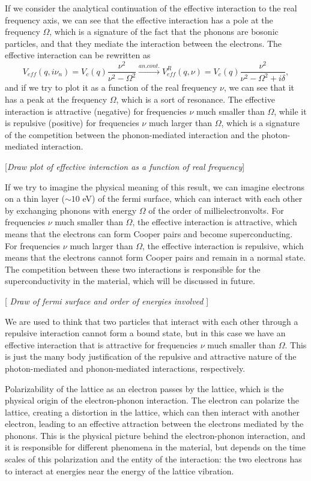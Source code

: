 If we consider the analytical continuation of the effective interaction to the real frequency axis, we can see that the effective interaction has a pole at the frequency \(\Omega\), which is a signature of the fact that the phonons are bosonic particles, and that they mediate the interaction between the electrons. The effective interaction can be rewritten as
\[
    V_{eff}(q,i \nu_n) = V_c(q) \frac{\nu^2}{\nu^2 - \Omega^2} \xrightarrow{an. cont.} V_{eff}^R (q, \nu) =  V_c(q) \frac{\nu^2}{\nu^2 - \Omega^2 + i \delta},
\]
and if we try to plot it as a function of the real frequency \(\nu\), we can see that it has a peak at the frequency \(\Omega\), which is a sort of resonance. The effective interaction is attractive (negative) for frequencies \(\nu\) much smaller than \(\Omega\), while it is repulsive (positive) for frequencies \(\nu\) much larger than \(\Omega\), which is a signature of the competition between the phonon-mediated interaction and the photon-mediated interaction.

    [\textit{Draw plot of effective interaction as a function of real frequency}]

If we try to imagine the physical meaning of this result, we can imagine electrons on a thin layer (\(\sim 10\) eV) of the fermi surface, which can interact with each other by exchanging phonons with energy \(\Omega\) of the order of millielectronvolts. For frequencies \(\nu\) much smaller than \(\Omega\), the effective interaction is attractive, which means that the electrons can form Cooper pairs and become superconducting. For frequencies \(\nu\) much larger than \(\Omega\), the effective interaction is repulsive, which means that the electrons cannot form Cooper pairs and remain in a normal state. The competition between these two interactions is responsible for the superconductivity in the material, which will be discussed in future.

    [ \textit{Draw of fermi surface and order of energies involved} ]

We are used to think that two particles that interact with each other through a repulsive interaction cannot form a bound state, but in this case we have an effective interaction that is attractive for frequencies \(\nu\) much smaller than \(\Omega\). This is just the many body justification of the repulsive and attractive nature of the photon-mediated and phonon-mediated interactions, respectively.

Polarizability of the lattice as an electron passes by the lattice, which is the physical origin of the electron-phonon interaction. The electron can polarize the lattice, creating a distortion in the lattice, which can then interact with another electron, leading to an effective attraction between the electrons mediated by the phonons. This is the physical picture behind the electron-phonon interaction, and it is responsible for different phenomena in the material, but depends on the time scales of this polarization and the entity of the interaction: the two electrons has to interact at energies near the energy of the lattice vibration.
